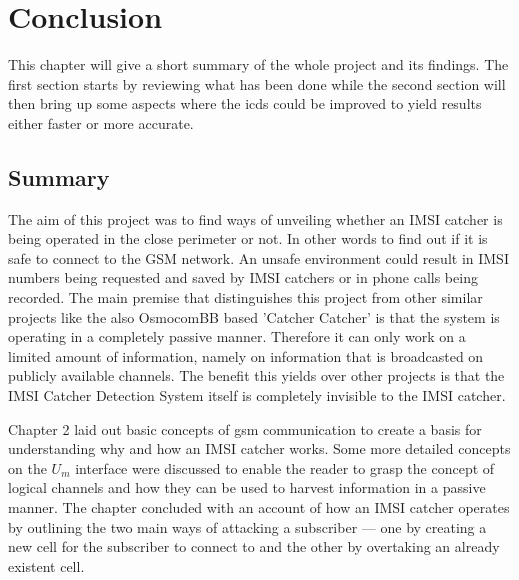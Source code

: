 \chapter{Conclusion}
This chapter will give a short summary of the whole project and its findings.
The first section starts by reviewing what has been done while the second section will then bring up some aspects where the \gls{icds} could be improved to yield results either faster or more accurate.

\section{Summary}
The aim of this project was to find ways of unveiling whether an IMSI catcher is being operated in the close perimeter or not.
In other words to find out if it is safe to connect to the GSM network.
An unsafe environment could result in IMSI numbers being requested and saved by IMSI catchers or in phone calls being recorded.
The main premise that distinguishes this project from other similar projects like the also  OsmocomBB based 'Catcher Catcher' is that the system is operating in a completely passive manner.
Therefore it can only work on a limited amount of information, namely on information that is broadcasted on publicly available channels.
The benefit this yields over other projects is that the IMSI Catcher Detection System itself is completely invisible to the IMSI catcher.

Chapter 2 laid out basic concepts of \gls{gsm} communication to create a basis for understanding why and how an IMSI catcher works.
Some more detailed concepts on the $U_m$ interface were discussed to enable the reader to grasp the concept of logical channels and how they can be used to harvest information in a passive manner.
The chapter concluded with an account of how an IMSI catcher operates by outlining the two main ways of attacking a subscriber --- one by creating a new cell for the subscriber to connect to and the other by overtaking an already existent cell.

